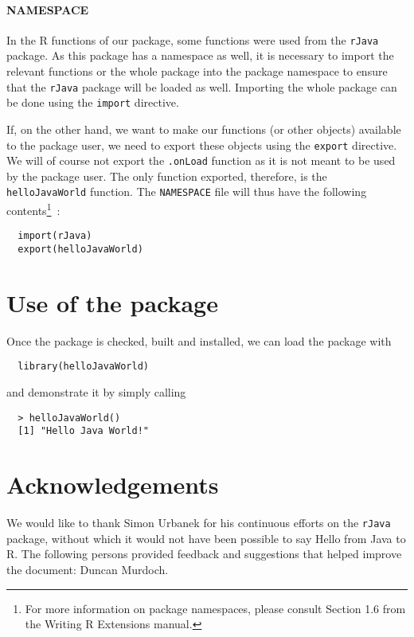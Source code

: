 \documentclass[a4paper, 11pt]{article}
\begin{document}
\paragraph{NAMESPACE}

In the R functions of our package, some functions were used from the
\texttt{rJava} package. As this package has a namespace as well, it
is necessary to import the relevant functions or the whole package into
the package namespace to ensure that the \texttt{rJava} package will be 
loaded as well. Importing the whole package can be done using the 
\texttt{import} directive. 

If, on the other hand, we want to make our functions (or other objects)
available to the package user, we need to export these objects using the
\texttt{export} directive. We will of course not export the \verb|.onLoad| 
function as it is not meant to be used by the package user. The
only function exported, therefore, is the \texttt{helloJavaWorld}
function. The \texttt{NAMESPACE} file will thus have the 
following contents\footnote{For more information on package namespaces, 
please consult Section 1.6 from the Writing R Extensions manual.}~:

\begin{verbatim}
  import(rJava)
  export(helloJavaWorld)
\end{verbatim}

\section{Use of the package}

Once the package is checked, built and installed, we
can load the package with
\begin{verbatim}
  library(helloJavaWorld)
\end{verbatim}

and demonstrate it by simply calling
\begin{verbatim}
  > helloJavaWorld()
  [1] "Hello Java World!"
\end{verbatim}

\section{Acknowledgements}

We would like to thank Simon Urbanek for his continuous efforts
on the \texttt{rJava} package, without which it would not have
been possible to say Hello from Java to R. The following persons
provided feedback and suggestions that helped improve the
document: Duncan Murdoch.
\end{document}
